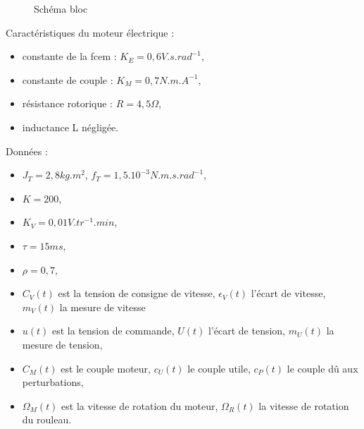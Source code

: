 \begin{figure}[!h]
\begin{center}
\end{center}
 \caption{Schéma bloc}
 \label{blocs1}
\end{figure}


Caractéristiques du moteur électrique :
\begin{itemize}
 \item constante de la fcem : $K_E=0,6 V.s.rad^{-1}$,
 \item constante de couple : $K_M=0,7 N.m.A^{-1}$,
 \item résistance rotorique : $R = 4,5 \Omega$,
 \item inductance L négligée.
\end{itemize}

Données :
\begin{itemize}
 \item $J_T=2,8kg.m^2$, $f_T=1,5.10^{-3}N.m.s.rad^{-1}$,
 \item $K=200$,
 \item $K_V=0,01V.tr^{-1}.min$,
 \item $\tau=15ms$,
 \item $\rho=0,7$,
 \item $C_V(t)$ est la tension de consigne de vitesse, $\epsilon_V(t)$ l'écart de vitesse, $m_V(t)$ la mesure de vitesse
 \item $u(t)$ est la tension de commande, $U(t)$ l'écart de tension, $m_U(t)$ la mesure de tension,
 \item $C_M(t)$ est le couple moteur, $c_U(t)$ le couple utile, $c_P(t)$ le couple dû aux perturbations,
 \item $\Omega_M(t)$ est la vitesse de rotation du moteur, $\Omega_R(t)$ la vitesse de rotation du rouleau.
\end{itemize}

